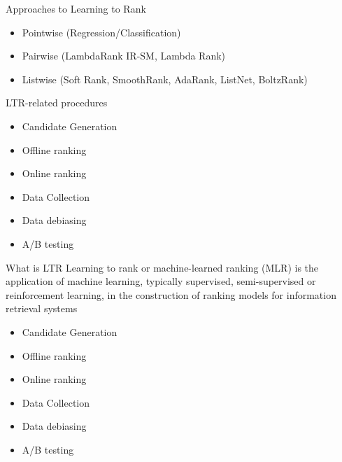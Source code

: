 \documentclass[10pt]{beamer}
\begin{document}
\begin{frame}{Approaches to Learning to Rank}
    \begin{itemize}
        \item Pointwise (Regression/Classification)
        \item Pairwise (LambdaRank IR-SM, Lambda Rank)
        \item Listwise (Soft Rank, SmoothRank, AdaRank, ListNet, BoltzRank)
    \end{itemize}
\end{frame}

\begin{frame}{LTR-related procedures}
    \begin{itemize}
        \item Candidate Generation
        \item Offline ranking
        \item Online ranking
        \item Data Collection
        \item Data debiasing
        \item A/B testing
    \end{itemize}
\end{frame}


\begin{frame}{What is LTR}
    Learning to rank or machine-learned ranking (MLR) is the application of machine learning, typically supervised, semi-supervised or reinforcement learning, in the construction of ranking models for information retrieval systems

    \begin{itemize}
        \item Candidate Generation
        \item Offline ranking
        \item Online ranking
        \item Data Collection
        \item Data debiasing
        \item A/B testing
    \end{itemize}
\end{frame}
\end{document}
